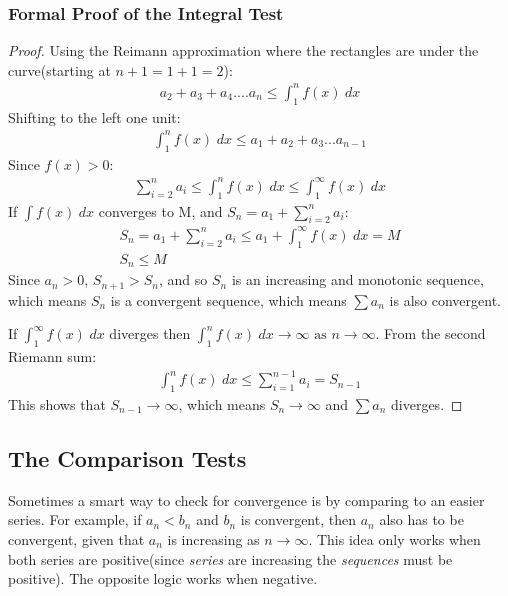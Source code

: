 \documentclass{article}
\begin{document}
\subsubsection{Formal Proof of the Integral Test}
\begin{proof}
Using the Reimann approximation where the rectangles are under the curve(starting at $n+1 = 1+1 = 2$):
\begin{gather*}
    a_2 + a_3 + a_4....a_n \leqslant \int_1^n f(x)\hspace{3pt}dx
\end{gather*}
Shifting to the left one unit:
\begin{gather*}
    \int_1^n f(x)\hspace{3pt}dx \leqslant a_1 + a_2 + a_3...a_{n-1}
\end{gather*}
Since $f(x) > 0$:
\begin{gather*}
    \sum_{i = 2}^n a_i \leqslant \int_1^n f(x)\hspace{3pt}dx \leqslant \int_1^\infty f(x)\hspace{3pt}dx
\end{gather*}
If $\int f(x)\hspace{3pt}dx$ converges to M, and $S_n = a_1 + \sum_{i = 2}^n a_i$:
\begin{gather*}
    S_n = a_1 + \sum_{i = 2}^n a_i \leqslant a_1 + \int_1^\infty f(x)\hspace{3pt}dx = M\\
    S_n \leqslant M
\end{gather*}
Since $a_n > 0$, $S_{n+1} > S_n$, and so $S_n$ is an increasing and monotonic sequence, which means $S_n$ is a convergent sequence, which means $\sum a_n$ is also convergent.

If $\int_1^\infty f(x)\hspace{3pt}dx$ diverges then $\int_1^n f(x)\hspace{3pt}dx \to \infty \textrm{ as } n \to \infty$. From the second Riemann sum:
\begin{gather*}
    \int_1^n f(x)\hspace{3pt}dx \leqslant \sum_{i=1}^{n-1} a_i = S_{n-1}
\end{gather*}
This shows that $S_{n-1} \to \infty$, which means $S_n \to \infty$ and $\sum a_n$ diverges.
\end{proof}
\subsection{The Comparison Tests}
Sometimes a smart way to check for convergence is by comparing to an easier series. For example, if $a_n < b_n$ and $b_n$ is convergent, then $a_n$ also has to be convergent, given that $a_n$ is increasing as $n \to \infty$. This idea only works when both series are positive(since \textit{series} are increasing the \textit{sequences} must be positive). The opposite logic works when negative.
\end{document}
